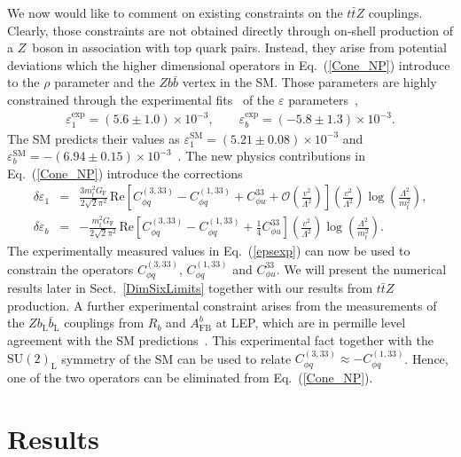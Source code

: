 \documentclass{JHEP3}
\def\ttbZ{t\bar{t}Z}
\newcommand{\be}{\begin{eqnarray}}
\newcommand{\ee}{\end{eqnarray}}
\begin{document}
We now would like to comment on existing constraints on the $\ttbZ$ couplings.
Clearly, those constraints are not obtained directly through on-shell production of a $Z$~boson in association with top quark pairs.
Instead, they arise from potential deviations which the higher dimensional operators in Eq.~(\ref{Cone_NP}) introduce to the $\rho$ parameter and the $Z b \bar{b}$ vertex in the SM.
Those parameters are highly constrained through the experimental fits~\cite{Ciuchini:2013pca} of the $\varepsilon$ parameters~\cite{Altarelli:1990zd,Altarelli:1991fk,Altarelli:1993sz},
\be
   \label{epsexp}
   \varepsilon_1^\mathrm{exp} = (5.6 \pm 1.0) \times 10^{-3}, \quad \quad \varepsilon_b^\mathrm{exp} = (-5.8 \pm 1.3) \times 10^{-3}.
\ee
The SM predicts their values as $\varepsilon_1^\mathrm{SM} = (5.21 \pm 0.08) \times 10^{-3} $ and
$\varepsilon_b^\mathrm{SM} = -(6.94 \pm 0.15) \times 10^{-3}$~\cite{Ciuchini:2013pca}.
The new physics contributions in Eq.~(\ref{Cone_NP}) introduce the corrections~\cite{Larios:1999au}
\be
   \delta \varepsilon_1 &=& \frac{3 m_t^2 G_\mathrm{F}}{2\sqrt{2}\pi^2}  
   \, \mathrm{Re}\left[  C^{(3,33)}_{\phi q}-C^{(1,33)}_{\phi q} + C^{33}_{\phi u} + \mathcal{O}\left(\frac{v^2}{\Lambda^2} \right) \right]
   \left( \frac{v^2}{\Lambda^2} \right) \log\left(\frac{\Lambda^2}{m_t^2}\right),
   \\
   \delta \varepsilon_b &=& -\frac{m_t^2 G_\mathrm{F}}{2\sqrt{2}\pi^2} 
   \, \mathrm{Re}\left[  C^{(3,33)}_{\phi q}-C^{(1,33)}_{\phi q} + \frac14 C^{33}_{\phi u}  \right]
   \left( \frac{v^2}{\Lambda^2} \right)\log\left(\frac{\Lambda^2}{m_t^2}\right).
\ee
The experimentally measured values in Eq.~(\ref{epsexp}) can now be used to constrain the operators 
$C^{(3,33)}_{\phi q}$,  $C^{(1,33)}_{\phi q}$ and $C^{33}_{\phi u}$.
We will present the numerical results later in Sect.~\ref{DimSixLimits} together with our results from $\ttbZ$ production.
A further experimental constraint arises from the measurements of the $Z b_\mathrm{L} \bar{b}_\mathrm{L}$ couplings from $R_b$ and $A^{b}_\mathrm{FB}$ at LEP, which are in permille level agreement with the SM predictions~\cite{Abdallah:2008ab}.
This experimental fact together with the $\mathrm{SU(2)_L}$ symmetry of the SM
can be used to relate $  C^{(3,33)}_{\phi q} \approx - C^{(1,33)}_{\phi q}$.
Hence, one of the two operators can be eliminated from Eq.~(\ref{Cone_NP}).




\section{Results}
\end{document}
